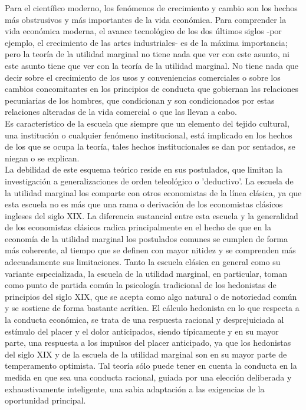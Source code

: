 Para el científico moderno, los fenómenos de crecimiento y cambio son los hechos más obstrusivos y más importantes de la vida económica. Para comprender la vida económica moderna, el avance tecnológico de los dos últimos siglos -por ejemplo, el crecimiento de las artes industriales- es de la máxima importancia; pero la teoría de la utilidad marginal no tiene nada que ver con este asunto, ni este asunto tiene que ver con la teoría de la utilidad marginal. No tiene nada que decir sobre el crecimiento de los usos y conveniencias comerciales o sobre los cambios concomitantes en los principios de conducta que gobiernan las relaciones pecuniarias de los hombres, que condicionan y son condicionados por estas relaciones alteradas de la vida comercial o que las llevan a cabo.\\

Es característico de la escuela que siempre que un elemento del tejido cultural, una institución o cualquier fenómeno institucional, está implicado en los hechos de los que se ocupa la teoría, tales hechos institucionales se dan por sentados, se niegan o se explican.\\

La debilidad de este esquema teórico reside en sus postulados, que limitan la investigación a generalizaciones de orden teleológico o 'deductivo'. La escuela de la utilidad marginal los comparte con otros economistas de la línea clásica, ya que esta escuela no es más que una rama o derivación de los economistas clásicos ingleses del siglo XIX. La diferencia sustancial entre esta escuela y la generalidad de los economistas clásicos radica principalmente en el hecho de que en la economía de la utilidad marginal los postulados comunes se cumplen de forma más coherente, al tiempo que se definen con mayor nitidez y se comprenden más adecuadamente sus limitaciones. Tanto la escuela clásica en general como su variante especializada, la escuela de la utilidad marginal, en particular, toman como punto de partida común la psicología tradicional de los hedonistas de principios del siglo XIX, que se acepta como algo natural o de notoriedad común y se sostiene de forma bastante acrítica. El cálculo hedonista en lo que respecta a la conducta económica, se trata de una respuesta racional y desprejuiciada al estímulo del placer y el dolor anticipados, siendo típicamente y en su mayor parte, una respuesta a los impulsos del placer anticipado, ya que los hedonistas del siglo XIX y de la escuela de la utilidad marginal son en su mayor parte de temperamento optimista. Tal teoría sólo puede tener en cuenta la conducta en la medida en que sea una conducta racional, guiada por una elección deliberada y exhaustivamente inteligente, una sabia adaptación a las exigencias de la oportunidad principal.\\

